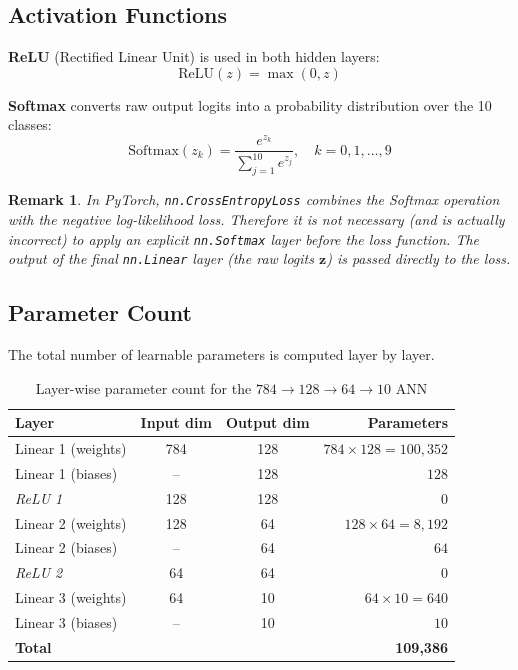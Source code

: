 \documentclass[12pt,a4paper]{article}
\newtheorem{remark}{Remark}[section]
\begin{document}
\subsection{Activation Functions}
\label{subsec:activations}

\textbf{ReLU} (Rectified Linear Unit) is used in both hidden layers:
\begin{equation}
  \text{ReLU}(z) = \max(0, z)
  \label{eq:relu}
\end{equation}

\textbf{Softmax} converts raw output logits into a probability distribution
over the 10 classes:
\begin{equation}
  \text{Softmax}(z_k) = \frac{e^{z_k}}{\sum_{j=1}^{10} e^{z_j}},
  \quad k = 0, 1, \ldots, 9
  \label{eq:softmax-eq}
\end{equation}

\begin{remark}
\label{rem:softmax-in-loss}
In PyTorch, \texttt{nn.CrossEntropyLoss} combines the Softmax operation
with the negative log-likelihood loss.  Therefore it is \emph{not} necessary
(and is actually incorrect) to apply an explicit \texttt{nn.Softmax} layer
before the loss function.  The output of the final \texttt{nn.Linear} layer
(the raw logits $\mathbf{z}$) is passed directly to the loss.
\end{remark}

\subsection{Parameter Count}
\label{subsec:params}

The total number of learnable parameters is computed layer by layer.

\begin{table}[htbp]
  \centering
  \caption{Layer-wise parameter count for the $784 \to 128 \to 64 \to 10$ ANN}
  \label{tab:params}
  \begin{tabular}{lccr}
    \toprule
    \textbf{Layer} & \textbf{Input dim} & \textbf{Output dim} & \textbf{Parameters} \\
    \midrule
    Linear 1 (weights) & 784 & 128 & $784 \times 128 = 100{,}352$ \\
    Linear 1 (biases)  & --  & 128 & $128$ \\
    \textit{ReLU 1}    & 128 & 128 & $0$ \\
    Linear 2 (weights) & 128 & 64  & $128 \times 64 = 8{,}192$ \\
    Linear 2 (biases)  & --  & 64  & $64$ \\
    \textit{ReLU 2}    & 64  & 64  & $0$ \\
    Linear 3 (weights) & 64  & 10  & $64 \times 10 = 640$ \\
    Linear 3 (biases)  & --  & 10  & $10$ \\
    \midrule
    \textbf{Total} & & & \textbf{109,386} \\
    \bottomrule
  \end{tabular}
\end{table}
\end{document}
